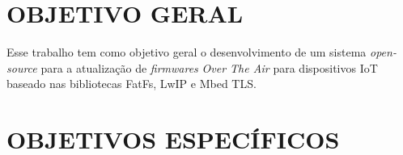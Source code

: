  










\section{OBJETIVO GERAL}
\label{sec:Objetivo Geral}

Esse trabalho tem como objetivo geral o desenvolvimento de um sistema \textit{open-source} para a atualização  de \textit{firmwares} \textit{Over The Air} para dispositivos IoT baseado nas bibliotecas FatFs, LwIP e Mbed TLS. 

\section{OBJETIVOS ESPECÍFICOS}
\label{sec:Objetivos Específicos}

